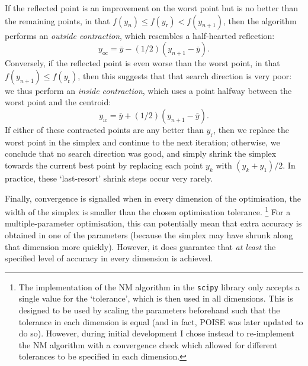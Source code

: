If the reflected point is an improvement on the worst point but is no better than the remaining points, in that $f(y_n) \leq f(y_\text{r}) < f(y_{n+1})$, then the algorithm performs an \textit{outside contraction}, which resembles a half-hearted reflection:
\begin{equation}
    \label{eq:nm_outside_contract}
    y_\text{oc} = \bar{y} - (1/2)(y_{n+1} - \bar{y}).
\end{equation}
Conversely, if the reflected point is even worse than the worst point, in that $f(y_{n+1}) \leq f(y_\text{r})$, then this suggests that that search direction is very poor: we thus perform an \textit{inside contraction}, which uses a point halfway between the worst point and the centroid:
\begin{equation}
    \label{eq:nm_inside_contract}
    y_\text{ic} = \bar{y} + (1/2)(y_{n+1} - \bar{y}).
\end{equation}
If either of these contracted points are any better than $y_\text{r}$, then we replace the worst point in the simplex and continue to the next iteration; otherwise, we conclude that no search direction was good, and simply shrink the simplex towards the current best point by replacing each point $y_k$ with $(y_k + y_1)/2$.
In practice, these `last-resort' shrink steps occur very rarely.

Finally, convergence is signalled when in every dimension of the optimisation, the width of the simplex is smaller than the chosen optimisation tolerance.%
\footnote{The implementation of the NM algorithm in the \texttt{scipy} library only accepts a single value for the `tolerance', which is then used in all dimensions.
This is designed to be used by scaling the parameters beforehand such that the tolerance in each dimension is equal (and in fact, POISE was later updated to do so).
However, during initial development I chose instead to re-implement the NM algorithm with a convergence check which allowed for different tolerances to be specified in each dimension.}
For a multiple-parameter optimisation, this can potentially mean that extra accuracy is obtained in one of the parameters (because the simplex may have shrunk along that dimension more quickly).
However, it does guarantee that \textit{at least} the specified level of accuracy in every dimension is achieved.
